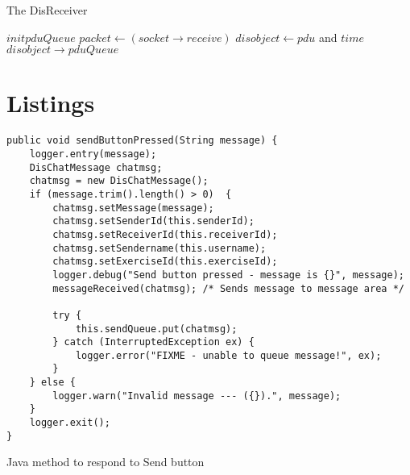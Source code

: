 \documentclass[12pt]{article}
\begin{document}
\begin{algorithm}
  \caption{The DisReceiver}\label{alg:disreceiver}
  \begin{algorithmic}[1]
    \State $init pduQueue$
    \State $packet \gets (socket \to receive)$
      \State $disobject \gets pdu$ and $time$
      \State $disobject \to pduQueue$
    \State 
    \EndProcedure
  \end{algorithmic}
\end{algorithm}

\section{Listings}

\begin{listing}[H]

   \begin{verbatim}
public void sendButtonPressed(String message) {
    logger.entry(message);
    DisChatMessage chatmsg;
    chatmsg = new DisChatMessage();
    if (message.trim().length() > 0)  {
        chatmsg.setMessage(message);
        chatmsg.setSenderId(this.senderId);
        chatmsg.setReceiverId(this.receiverId);
        chatmsg.setSendername(this.username);
        chatmsg.setExerciseId(this.exerciseId);
        logger.debug("Send button pressed - message is {}", message);
        messageReceived(chatmsg); /* Sends message to message area */

        try {
            this.sendQueue.put(chatmsg);
        } catch (InterruptedException ex) {
            logger.error("FIXME - unable to queue message!", ex);
        }
    } else {
        logger.warn("Invalid message --- ({}).", message);
    }
    logger.exit();
}
   \end{verbatim}
   \caption{Java method to respond to Send button}
   \label{lst:awk-script}
\end{listing}
\end{document}
